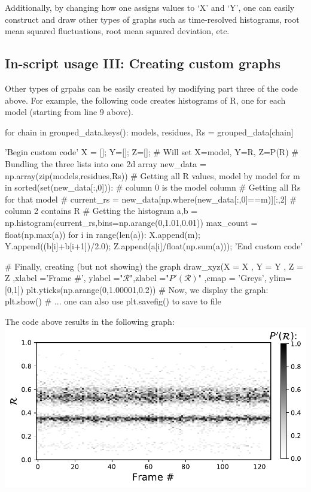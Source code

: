 \documentclass[fleqn,10pt,lineno]{wlpeerj} %
\begin{document}
\begin{enumerate}
Additionally, by changing how one assigns values to `X' and `Y', 
one can easily construct and draw other types of graphs such as time-resolved histograms, 
root mean squared fluctuations, root mean squared deviation, etc. 
\end{enumerate}

\subsection*{In-script usage III: Creating custom graphs}
Other types of grpahs can be easily created by modifying part three of the code above. 
For example, the following code creates histograms of R, one for each model (starting from line 9 above).
\begin{python}[firstnumber=9]
	for chain in grouped_data.keys():
		models, residues, Rs = grouped_data[chain]
		
		'Begin custom code'
		X = []; Y=[]; Z=[]; # Will set X=model, Y=R, Z=P(R)
		# Bundling the three lists into one 2d array
		new_data =  np.array(zip(models,residues,Rs))
		# Getting all R values, model by model
		for m in sorted(set(new_data[:,0])): # column 0 is the model column
			# Getting all Rs for that model #
			current_rs = new_data[np.where(new_data[:,0]==m)][:,2] # column 2 contains R
			# Getting the histogram
			a,b = np.histogram(current_rs,bins=np.arange(0,1.01,0.01))
			max_count = float(np.max(a))
			for i in range(len(a)):
				X.append(m); Y.append((b[i]+b[i+1])/2.0); Z.append(a[i]/float(np.sum(a)));
		'End custom code'
		
		# Finally, creating (but not showing) the graph 
		draw_xyz(X = X       ,      Y = Y  ,                Z = Z
		   ,xlabel ='Frame #', ylabel ="$\mathcal{R}$",zlabel ="$P'(\mathcal{R})$"
			 ,cmap = 'Greys', ylim=[0,1])
		plt.yticks(np.arange(0,1.00001,0.2))
		# Now, we display the graph:
		plt.show() # ... one can also use plt.savefig() to save to file
\end{python}
The code above results in the following graph:\\
\includegraphics[width=0.5\linewidth]{automated_figures/example2.pdf}
\end{document}
